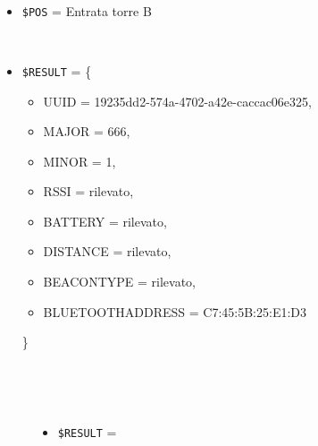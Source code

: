 \documentclass[../../SperimentazioniPratiche.tex]{subfiles}
\begin{document}
			\begin{tcolorbox}[fonttitle=\bfseries, 
								adjusted title={\Large Prova 9A.1}, 
								breakable, 
								sharp corners=south,
								colback=white, 
								colframe=white!60!black]
								
				\begin{description}[leftmargin=0.7cm,labelwidth=!]
				
					\item[Input] \ \par 
        				\begin{itemize}
        					\item \verb|$POS| = Entrata torre B
        				\end{itemize}
        				
        			\tcbline 
        				
        			\item[Output atteso] \ \par
        				\begin{itemize}
        					\item \verb|$RESULT| = \{
        					\begin{itemize}[label={}]
        						\item UUID = 19235dd2-574a-4702-a42e-caccac06e325,
								\item MAJOR = 666,
								\item MINOR = 1,
								\item RSSI = rilevato,
								\item BATTERY = rilevato,
								\item DISTANCE = rilevato,
								\item BEACONTYPE = rilevato,
								\item BLUETOOTHADDRESS = C7:45:5B:25:E1:D3
        					\end{itemize}
        					\}
        				\end{itemize}

					\tcbline        				
        				
        			\item[Output riscontrato] \ \par
        				\begin{description}
        				
        					\item[\dispositivoA] \ \par
        					\begin{itemize}
        						\item \verb|$RESULT| = \ok
        					\end{itemize}      					
        					

\end{description}
\end{description}
\end{tcolorbox}
\end{document}
